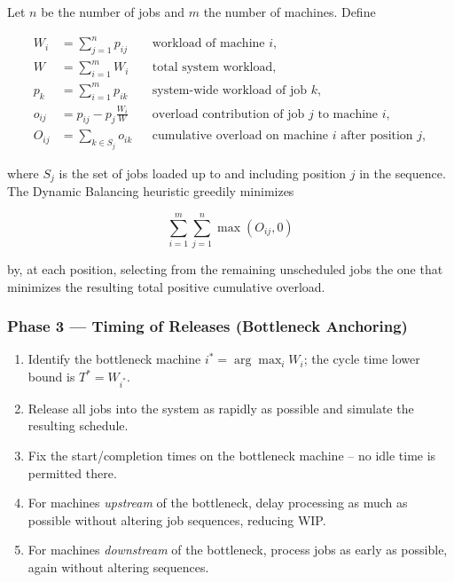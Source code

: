 \documentclass[11pt,a4paper]{article}
\begin{document}
Let $n$ be the number of jobs and $m$ the number of machines. Define

\begin{align*}
  W_i &= \sum_{j=1}^n p_{ij} && \text{workload of machine } i, \\
  W &= \sum_{i=1}^m W_i && \text{total system workload}, \\
  p_k &= \sum_{i=1}^m p_{ik} && \text{system-wide workload of job } k, \\
  o_{ij} &= p_{ij} - p_j \frac{W_i}{W} && \text{overload contribution of job } j \text{ to machine } i, \\
  O_{ij} &= \sum_{k \in S_j} o_{ik} && \text{cumulative overload on machine } i \text{ after position } j,
\end{align*}

where $S_j$ is the set of jobs loaded up to and including position $j$ in
the sequence. The Dynamic Balancing heuristic greedily minimizes

\begin{equation}
  \sum_{i=1}^{m} \sum_{j=1}^{n} \max(O_{ij}, 0)
  \label{eq:overload}
\end{equation}

by, at each position, selecting from the remaining unscheduled jobs the
one that minimizes the resulting total positive cumulative overload.

\subsubsection*{Phase 3 --- Timing of Releases (Bottleneck Anchoring)}

\begin{enumerate}
  \item Identify the bottleneck machine $i^\ast = \arg\max_i W_i$; the
    cycle time lower bound is $T^\ast = W_{i^\ast}$.
  \item Release all jobs into the system as rapidly as possible and
    simulate the resulting schedule.
  \item Fix the start/completion times on the bottleneck machine -- no
    idle time is permitted there.
  \item For machines \emph{upstream} of the bottleneck, delay processing
    as much as possible without altering job sequences, reducing WIP.
  \item For machines \emph{downstream} of the bottleneck, process jobs as
    early as possible, again without altering sequences.
\end{enumerate}
\end{document}
